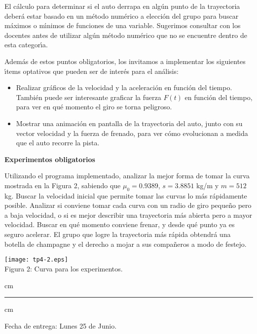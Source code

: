 \documentclass[11pt, a4paper]{article}
\begin{document}
El c\'alculo para determinar si el auto derrapa en alg\'un punto de la
trayectoria deber\'a estar basado en un m\'etodo num\'erico a elecci\'on del
grupo para buscar m\'aximos o m\'\i nimos de funciones de una variable.
Sugerimos consultar con los docentes antes de utilizar alg\'un m\'etodo
num\'erico que no se encuentre dentro de esta categor\'\i a.

Adem\'as de estos puntos obligatorios, los invitamos a implementar los
siguientes \'\i tems optativos que pueden ser de inter\'es para el
an\'alisis:
\begin{itemize}
\item Realizar gr\'aficos de la velocidad y la aceleraci\'on en funci\'on
del tiempo. Tambi\'en puede ser interesante graficar la fuerza $F(t)$ en
funci\'on del tiempo, para ver en qu\'e momento el giro se torna peligroso.
\item Mostrar una animaci\'on en pantalla de la trayectoria del auto, junto
con su vector velocidad y la fuerza de frenado, para ver c\'omo evolucionan
a medida que el auto recorre la pista.
\end{itemize}

\vfil \eject

\textbf{Experimentos obligatorios}

Utilizando el programa implementado, analizar la mejor forma de tomar la
curva mostrada en la Figura 2, sabiendo que $\mu_0 = 0.9389$, $s = 3.8851$
kg/m y $m = 512$ kg. Buscar la velocidad inicial que permite
tomar las curvas lo m\'as r\'apidamente posible. Analizar si conviene tomar
cada curva con un radio de giro peque\~no pero a baja velocidad, o si es mejor
describir una trayectoria m\'as abierta pero a mayor velocidad. Buscar en
qu\'e momento conviene frenar, y desde qu\'e punto ya es seguro acelerar.
El grupo que logre la trayectoria m\'as r\'apida obtendr\'a una botella
de champagne y el derecho a mojar a sus compa\~neros a modo de festejo.

\begin{centering}
\texttt{[image: tp4-2.eps]} \\
Figura 2: Curva para los experimentos. \\
\end{centering}

 cm
\hrule
{} cm

Fecha de entrega: Lunes 25 de Junio.
\end{document}
